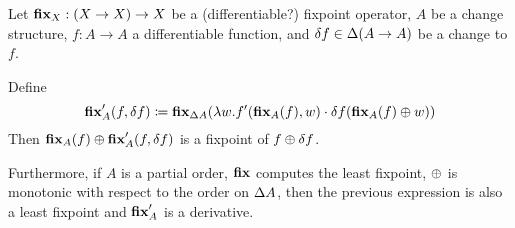 \begin{thm}
  Let $\textbf{fix}_X : (X \rightarrow X) \rightarrow X$ be a (differentiable?)
  fixpoint operator, $A$ be a change structure, $f: A \rightarrow A$ a differentiable function,
  and $\delta f \in \Delta (A \rightarrow A)$ be a change to $f$.

  Define
  $$
  \textbf{fix}_A'(f, \delta f) \coloneqq
  \textbf{fix}_{\Delta A}(
    \lambda w .
      f'(\textbf{fix}_A(f), w)
      \cdot
      \delta f(\textbf{fix}_A(f) \oplus w)
  )
  $$
  Then $\textbf{fix}_A(f) \oplus \textbf{fix}_A'(f, \delta f)$ is a fixpoint of $f \oplus \delta f$.

  Furthermore, if $A$ is a partial order, $\textbf{fix}$ computes the least
  fixpoint, $\oplus$ is monotonic with respect to the order on $\Delta A$,
  then the previous expression is also a least fixpoint and
  $\textbf{fix}_A'$ is a derivative.
\end{thm}

\newcommand{\thefixpoint}{F}
\newcommand{\theadjustment}{adjust}

